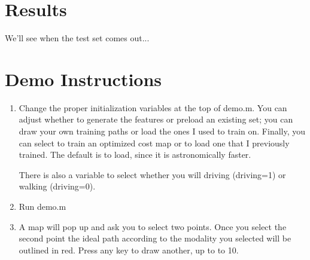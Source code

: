 \documentclass{article}
\begin{document}
\section{Results}
We'll see when the test set comes out...

\section{Demo Instructions}
\begin{enumerate}
	\item Change the proper initialization variables at the top of demo.m. You can adjust whether to generate the features or preload an existing set; you can draw your own training paths or load the ones I used to train on. Finally, you can select to train an optimized cost map or to load one that I previously trained. The default is to load, since it is astronomically faster. 
	\par
	There is also a variable to select whether you will driving (driving=1) or walking (driving=0).

	\item Run demo.m
	\item A map will pop up and ask you to select two points. Once you select the second point the ideal path according to the modality you selected will be outlined in red. Press any key to draw another, up to to 10.

\end{enumerate}
\end{document}
